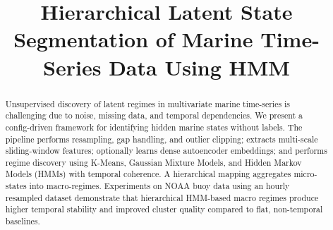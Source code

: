 \documentclass[conference]{IEEEtran}
\begin{document}
\title{Hierarchical Latent State Segmentation of Marine Time-Series Data Using HMM}

\author{
\and
{}
\and
{}
\and
{}
\and
{}
\and
{}
}

\maketitle

\begin{abstract}
Unsupervised discovery of latent regimes in multivariate marine time-series is challenging due to noise, missing data, and temporal dependencies. We present a config-driven framework for identifying hidden marine states without labels. The pipeline performs resampling, gap handling, and outlier clipping; extracts multi-scale sliding-window features; optionally learns dense autoencoder embeddings; and performs regime discovery using K-Means, Gaussian Mixture Models, and Hidden Markov Models (HMMs) with temporal coherence. A hierarchical mapping aggregates micro-states into macro-regimes. Experiments on NOAA buoy data using an hourly resampled dataset demonstrate that hierarchical HMM-based macro regimes produce higher temporal stability and improved cluster quality compared to flat, non-temporal baselines.
\end{abstract}
\end{document}
